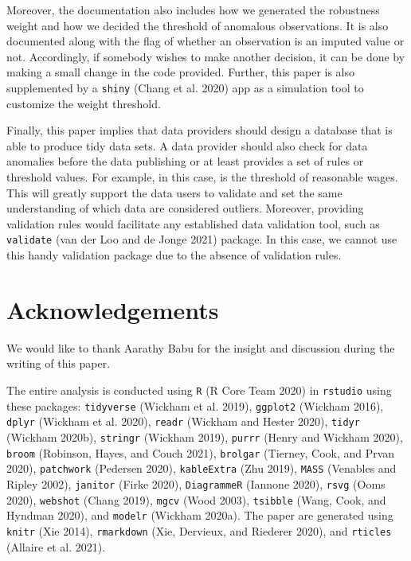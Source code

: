 \documentclass[12pt]{article}
\begin{document}
Moreover, the documentation also includes how we generated the robustness weight and how we decided the threshold of anomalous observations. It is also documented along with the flag of whether an observation is an imputed value or not. Accordingly, if somebody wishes to make another decision, it can be done by making a small change in the code provided. Further, this paper is also supplemented by a \texttt{shiny} (Chang et al. 2020) app as a simulation tool to customize the weight threshold.

Finally, this paper implies that data providers should design a database that is able to produce tidy data sets. A data provider should also check for data anomalies before the data publishing or at least provides a set of rules or threshold values. For example, in this case, is the threshold of reasonable wages. This will greatly support the data users to validate and set the same understanding of which data are considered outliers. Moreover, providing validation rules would facilitate any established data validation tool, such as \texttt{validate} (van der Loo and de Jonge 2021) package. In this case, we cannot use this handy validation package due to the absence of validation rules.

\hypertarget{acknowledgements}{%
\section{Acknowledgements}\label{acknowledgements}}

We would like to thank Aarathy Babu for the insight and discussion during the writing of this paper.

The entire analysis is conducted using \texttt{R} (R Core Team 2020) in \texttt{rstudio} using these packages: \texttt{tidyverse} (Wickham et al. 2019), \texttt{ggplot2} (Wickham 2016), \texttt{dplyr} (Wickham et al. 2020), \texttt{readr} (Wickham and Hester 2020), \texttt{tidyr} (Wickham 2020b), \texttt{stringr} (Wickham 2019), \texttt{purrr} (Henry and Wickham 2020), \texttt{broom} (Robinson, Hayes, and Couch 2021), \texttt{brolgar} (Tierney, Cook, and Prvan 2020), \texttt{patchwork} (Pedersen 2020), \texttt{kableExtra} (Zhu 2019), \texttt{MASS} (Venables and Ripley 2002), \texttt{janitor} (Firke 2020), \texttt{DiagrammeR} (Iannone 2020), \texttt{rsvg} (Ooms 2020), \texttt{webshot} (Chang 2019), \texttt{mgcv} (Wood 2003), \texttt{tsibble} (Wang, Cook, and Hyndman 2020), and \texttt{modelr} (Wickham 2020a). The paper are generated using \texttt{knitr} (Xie 2014), \texttt{rmarkdown} (Xie, Dervieux, and Riederer 2020), and \texttt{rticles} (Allaire et al. 2021).
\end{document}
